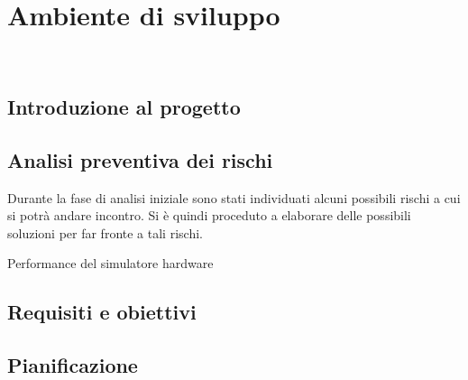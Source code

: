 
\chapter{Ambiente di sviluppo}
\label{cap:ambiente-sviluppo}

\\

\section{Introduzione al progetto}

\section{Analisi preventiva dei rischi}

Durante la fase di analisi iniziale sono stati individuati alcuni possibili rischi a cui si potrà andare incontro.
Si è quindi proceduto a elaborare delle possibili soluzioni per far fronte a tali rischi.\\

\begin{risk}{Performance del simulatore hardware}
    \label{risk:hardware-simulator} 
\end{risk}

\section{Requisiti e obiettivi}


\section{Pianificazione}